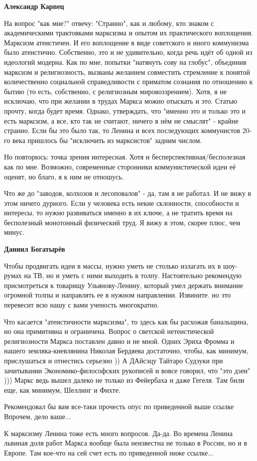 \begin{itemize}
\begin{itemize}
\textbf{Александр Карпец} 

На вопрос "как мне?" отвечу: "Странно", как и любому, кто знаком с
академическими трактовками марксизма и опытом их практического воплощения.
Марксизм атеистичен. И его воплощение в виде советского и иного коммунизма было
атеистично. Собственно, это и не удивительно, когда речь идёт об одной из
идеологий модерна. Как по мне, попытки "натянуть сову на глобус", объединив
марксизм и религиозность, вызваны желанием совместить стремление к понятой
количественно социальной справедливости с приматом сознания по отношению к
бытию (то есть, собственно, с религиозным мировоззрением). Хотя, я не исключаю,
что при желании в трудах Маркса можно отыскать и это. Статью прочту, когда
будет время. Однако, утверждать, что "именно это и только это и есть марксизм,
а все, кто так не считают, ничего в нём не смыслят" - крайне странно. Если бы
это было так, то Ленина и всех последующих коммунистов 20-го века пришлось бы
"исключить из марксистов" задним числом.

Но повторюсь: точка зрения интересная. Хотя и бесперспективная/бесполезная как
по мне. Возможно, современные сторонники коммунистической идеи её оценят, но
благо, я к ним не отношусь.

Что же до "заводов, колхозов и лесоповалов" - да, там я не работал. И не вижу в
этом ничего дурного. Если у человека есть некие склонности, способности и
интересы, то нужно развиваться именно в их ключе, а не тратить время на
бесполезный монотонный физический труд. Я вижу в этом, скорее плюс, чем минус.

\textbf{Даниил Богатырёв} 

Чтобы продвигать идеи в массы, нужно уметь не столько излагать их в шоу-румах
на ТВ, но и уметь с ними выходить в толпу. Настоятельно рекомендую
присмотреться к товарищу Ульянову-Ленину, который умел держать внимание
огромной толпы и направлять ее в нужном направлении. Извините. но это перевесит
всю нашу с вами ученость многократно.

Что касается "атеистичности марксизма", то здесь как бы расхожая банальщина, но
она примитивна и ограничена. Вопрос о светской нетеистической религиозности
Маркса поставлен давно и не мной. Одних Эриха Фромма и нашего
земляка-киевлянина Николая Бердяева достаточно, чтобы, как минимум,
прислушаться и отнестись серьезно )) А ДАйсэцу Тайтаро Судзуки при зачитывании
Экономико-философских рукописей и вовсе говорил, что "это дзен" ))) Маркс ведь
вышел далеко не только из Фейербаха и даже Гегеля. Там били еще, как минимум,
Шеллинг и Фихте.

Рекомендовал бы вам все-таки прочесть опус по приведенной выше ссылке Впрочем,
дело ваше...

К марксизму Ленина тоже есть много вопросов. Да-да. Во времена Ленина львиная
доля работ Маркса вообще была неизвестна не только в России, но и в Европе. Там
кое-что на сей счет есть по приведенной ниже ссылке...

\end{itemize} %

\end{itemize} %
